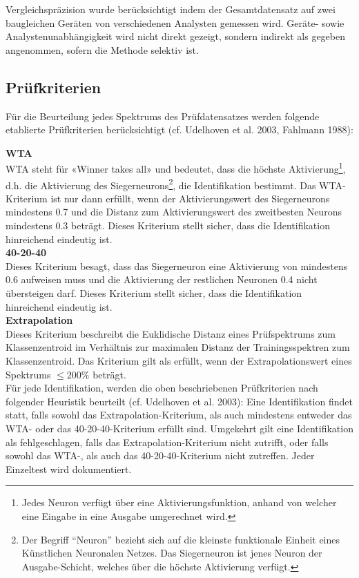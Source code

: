 \documentclass[11pt, a4paper]{article}
\begin{document}
Vergleichspräzision wurde berücksichtigt indem der Gesamtdatensatz auf zwei baugleichen Geräten von verschiedenen Analysten gemessen wird. Geräte- sowie Analystenunabhängigkeit wird nicht direkt gezeigt, sondern indirekt als gegeben angenommen, sofern die Methode selektiv ist.


\subsection{Prüfkriterien}
\label{sec:Prüfkriterien}
Für die Beurteilung jedes Spektrums des Prüfdatensatzes werden folgende etablierte Prüfkriterien berücksichtigt (cf. Udelhoven et al. 2003, Fahlmann 1988):

\textbf{WTA}\\[1.2pt]
WTA steht für «Winner takes all» und bedeutet, dass die höchste Aktivierung\footnote{Jedes Neuron verfügt über eine Aktivierungsfunktion, anhand von welcher eine Eingabe in eine Ausgabe umgerechnet wird.}, d.h. die Aktivierung des Siegerneurons\footnote{Der Begriff “Neuron” bezieht sich auf die kleinste funktionale Einheit eines Künstlichen Neuronalen Netzes. Das Siegerneuron ist jenes Neuron der Ausgabe-Schicht, welches über die höchste Aktivierung verfügt.}, die Identifikation bestimmt. Das WTA-Kriterium ist nur dann erfüllt, wenn der Aktivierungswert des Siegerneurons mindestens 0.7 und die Distanz zum Aktivierungswert des zweitbesten Neurons mindestens 0.3 beträgt. Dieses Kriterium stellt sicher, dass die Identifikation hinreichend eindeutig ist.\\

\textbf{40-20-40}\\[1.2pt]
Dieses Kriterium besagt, dass das Siegerneuron eine Aktivierung von mindestens 0.6 aufweisen muss und die Aktivierung der restlichen Neuronen 0.4 nicht übersteigen darf. Dieses Kriterium stellt sicher, dass die Identifikation hinreichend eindeutig ist. \\

\textbf{Extrapolation}\\[1.2pt]
Dieses Kriterium beschreibt die Euklidische Distanz eines Prüfspektrums zum Klassenzentroid im Verhältnis zur maximalen Distanz der Trainingsspektren zum Klassenzentroid. Das Kriterium gilt als erfüllt, wenn der Extrapolationswert eines Spektrums $\leq 200\%$ beträgt. \\

Für jede Identifikation, werden die oben beschriebenen Prüfkriterien nach folgender Heuristik beurteilt (cf. Udelhoven et al. 2003): Eine Identifikation findet statt, falls sowohl das Extrapolation-Kriterium, als auch mindestens entweder das WTA- oder das 40-20-40-Kriterium erfüllt sind. Umgekehrt gilt eine Identifikation als fehlgeschlagen, falls das Extrapolation-Kriterium nicht zutrifft, oder falls sowohl das WTA-, als auch das 40-20-40-Kriterium nicht zutreffen. Jeder Einzeltest wird dokumentiert.
\end{document}
